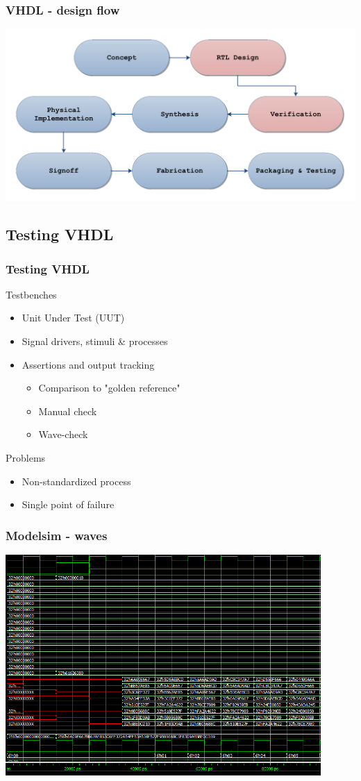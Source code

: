 \documentclass[british,10pt]{beamer}
\begin{document}
\begin{frame}\frametitle{VHDL - design flow}
\includegraphics[width=\textwidth]{images/VHDLflow.pdf}
\end{frame}

\subsection{Testing VHDL}

\begin{frame}\frametitle{Testing VHDL}
Testbenches
\begin{itemize}
\item Unit Under Test (UUT)
\item Signal drivers, stimuli \& processes
\item Assertions and output tracking
\begin{itemize}
\item Comparison to "golden reference"
\item Manual check
\item Wave-check
\end{itemize}
\end{itemize}
\vspace{0.25cm}
Problems
\begin{itemize}
\item Non-standardized process
\item Single point of failure
\end{itemize}
\end{frame}

\begin{frame}\frametitle{Modelsim - waves}
\centering
\includegraphics[width=0.9\textwidth]{images/waves.png}
\end{frame}
\end{document}
